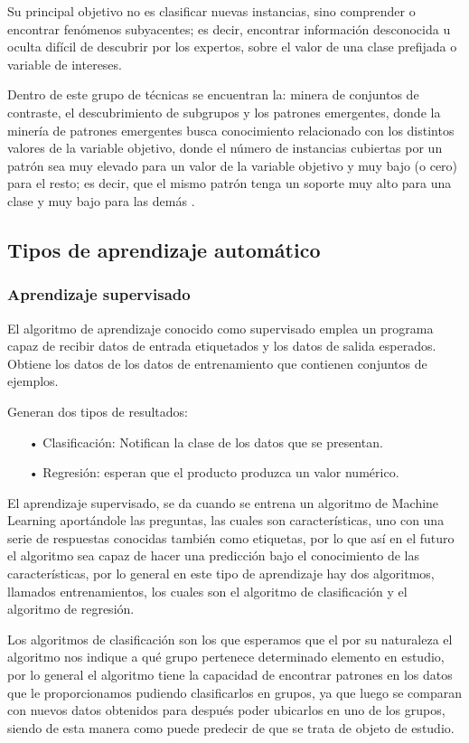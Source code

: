 Su principal objetivo no es clasificar nuevas instancias, sino comprender o encontrar fenómenos subyacentes; es decir, encontrar información desconocida u oculta difícil de descubrir por los expertos, sobre el valor de una clase prefijada o variable de intereses.

Dentro de este grupo de técnicas se encuentran la: minera de conjuntos de contraste, el descubrimiento de subgrupos y los patrones emergentes, donde la minería de patrones emergentes busca conocimiento relacionado con los distintos valores de la variable objetivo, donde el número de instancias cubiertas por un patrón sea muy elevado para un valor de la variable objetivo y muy bajo (o cero) para el resto; es decir, que el mismo patrón tenga un soporte muy alto para una clase y muy bajo para las demás \cite{Carmona2015}.


\subsection{Tipos de aprendizaje automático}

\subsubsection{Aprendizaje supervisado}

El algoritmo de aprendizaje conocido como supervisado emplea un programa capaz de recibir datos de entrada etiquetados y los datos de salida esperados. Obtiene los datos de los datos de entrenamiento que contienen conjuntos de ejemplos.

Generan dos tipos de resultados:
\begin{itemize}
\item[•] Clasificación: Notifican la clase de los datos que se presentan.
\item[•] Regresión: esperan que el producto produzca un valor numérico.
\end{itemize}

El aprendizaje supervisado, se da cuando se entrena un algoritmo de Machine Learning aportándole las preguntas, las cuales son características, uno con una serie de respuestas conocidas también como etiquetas, por lo que así en el futuro el algoritmo sea capaz de hacer una predicción bajo el conocimiento de las características, por lo general en este tipo de aprendizaje hay dos algoritmos, llamados entrenamientos, los cuales son el algoritmo de clasificación y el algoritmo de regresión.

Los algoritmos de clasificación son los que esperamos que el por su naturaleza el algoritmo nos indique a qué grupo pertenece determinado elemento en estudio, por lo general el algoritmo tiene la capacidad de encontrar patrones en los datos que le proporcionamos pudiendo clasificarlos en grupos, ya que luego se comparan con nuevos datos obtenidos para después poder ubicarlos en uno de los grupos, siendo de esta manera como puede predecir de que se trata de objeto de estudio. 
 

